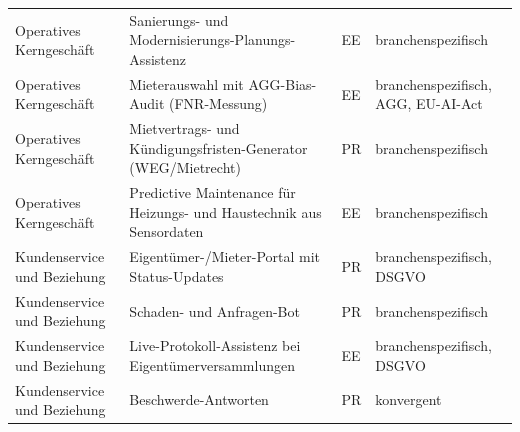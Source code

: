 \documentclass[a4paper,11pt]{article}
\begin{document}
\begin{table}[H]
\begin{tabular}{p{3.3cm}p{7.3cm}p{1cm}p{2.5cm}}
Operatives Kerngeschäft & Sanierungs- und Modernisierungs-Planungs-Assistenz & EE & branchenspezifisch \\
Operatives Kerngeschäft & Mieterauswahl mit AGG-Bias-Audit (FNR-Messung) & EE & branchenspezifisch, AGG, EU-AI-Act \\
Operatives Kerngeschäft & Mietvertrags- und Kündigungsfristen-Generator (WEG/Mietrecht) & PR & branchenspezifisch \\
Operatives Kerngeschäft & Predictive Maintenance für Heizungs- und Haustechnik aus Sensordaten & EE & branchenspezifisch \\
Kundenservice und Beziehung & Eigentümer-/Mieter-Portal mit Status-Updates & PR & branchenspezifisch, DSGVO \\
Kundenservice und Beziehung & Schaden- und Anfragen-Bot & PR & branchenspezifisch \\
Kundenservice und Beziehung & Live-Protokoll-Assistenz bei Eigentümerversammlungen & EE & branchenspezifisch, DSGVO \\
Kundenservice und Beziehung & Beschwerde-Antworten & PR & konvergent \\
\bottomrule
\end{tabular}
\end{table}

\newpage

\printbibliography
{}
\end{document}
